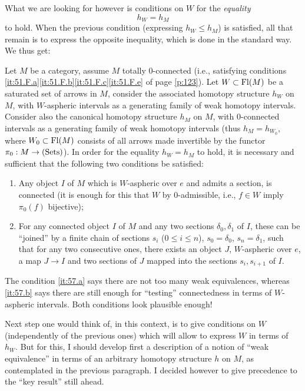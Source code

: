 What we are looking for however is conditions on $W$ for the
\emph{equality}
\[ h_W=h_M\]
to hold. When the previous condition (expressing $h_W\le h_M$) is
satisfied, all that remain is to express the opposite inequality,
which is done in the standard way. We thus get:
\begin{proposition}
  Let $M$ be a category, assume $M$ totally $0$-connected
  \textup(i.e., satisfying conditions
  \textup{\ref{it:51.F.a}\ref{it:51.F.b}\ref{it:51.F.c}\ref{it:51.F.e}}
  of page \ref{p:123}\textup). Let $W\subset\operatorname{Fl}(M)$ be a saturated set
  of arrows in $M$, consider the associated homotopy structure $h_W$
  on $M$, with $W$-aspheric intervals as a generating family of weak
  homotopy intervals. Consider also the canonical homotopy structure
  $h_M$ on $M$, with $0$-connected intervals as a generating family of
  weak homotopy intervals \textup(thus $h_M=h_{W_0}$, where
  $W_0\subset\operatorname{Fl}(M)$ consists of all arrows made invertible by the
  functor $\pi_0:M\to{\ensuremath{(\mathrm{Sets})}}$\textup). In order for the equality
  $h_W=h_M$ to hold, it is necessary and sufficient that the following
  two conditions be satisfied:
  \begin{enumerate}[label=\alph*),font=\normalfont]
  \item\label{it:57.a}
    Any object $I$ of $M$ which is $W$-aspheric over $e$ and admits a
    section, is connected \textup(it is enough for this that $W$ by
    $0$-admissible, i.e., $f\in W$ imply $\pi_0(f)$ bijective\textup);
  \item\label{it:57.b}
    For any connected object $I$ of $M$ and any two sections
    $\delta_0,\delta_1$ of $I$, these can be ``joined'' by a finite
    chain of sections $s_i$ \textup($0\le i\le n$\textup),
    $s_0=\delta_0$, $s_n=\delta_1$, such that for any two consecutive
    ones, there exists an object $J$, $W$-aspheric over $e$, a map
    $J\to I$ and two sections of $J$ mapped into the sections
    $s_i,s_{i+1}$ of $I$.
  \end{enumerate}
\end{proposition}

The condition \ref{it:57.a} says there are not too many weak
equivalences, whereas \ref{it:57.b} says there are still enough for
``testing'' connectedness in terms of $W$-aspheric intervals. Both
conditions look plausible enough!

Next step one would think of, in this context, is to give conditions
on $W$ (independently of the previous ones) which will allow to
express $W$ in terms of $h_W$. But for this, I should develop first a
description of a notion of ``weak equivalence'' in terms of an
arbitrary homotopy structure $h$ on $M$, as contemplated in the
previous paragraph. I decided however to give precedence to the ``key
result'' still ahead.

